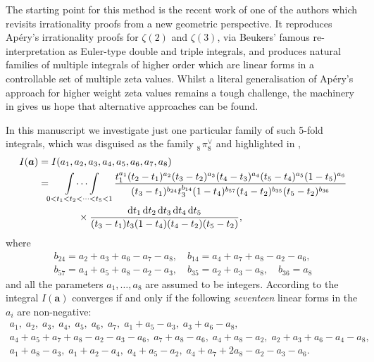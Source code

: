 \documentclass[12pt,reqno]{amsart}
\theoremstyle{remark}
\renewcommand{\d}{{\mathrm d}}
\newcommand\ba{\boldsymbol a}
\begin{document}
The starting point for this method is the recent work \cite{Br16} of one of the authors  which revisits irrationality proofs from a new   geometric perspective. It reproduces  Ap\'ery's irrationality proofs for $\zeta(2)$ and $\zeta(3)$, via Beukers'  famous  re-interpretation \cite{Be79} as Euler-type double and triple integrals,   and produces natural families of multiple integrals of higher order which are linear forms in a  controllable set of multiple zeta values. Whilst a literal generalisation of  Ap\'ery's approach for higher weight zeta values remains a tough challenge, the machinery in \cite{Br16} gives us hope that alternative approaches can be found.

In this manuscript we investigate just one  particular family of such 5-fold integrals, which was  disguised as the family ${}^{\phantom\vee}_8\!\pi^\vee_8$ and highlighted in \cite[Example 7.5]{Br16},
\begin{align}
I(\ba)
&=I(a_1,a_2,a_3,a_4,a_5,a_6,a_7,a_8)
\nonumber\\
&=\idotsint\limits_{0<t_1<t_2<\dots<t_5<1}
\frac{t_1^{a_1}(t_2 - t_1)^{a_2}(t_3 - t_2)^{a_3}(t_4 - t_3)^{a_4}(t_5 - t_4)^{a_5}(1 - t_5)^{a_6}}
{(t_3 - t_1)^{b_{24}}t_3^{b_{14}}(1 - t_4)^{b_{57}}
(t_4 - t_2)^{b_{35}}(t_5 - t_2)^{b_{36}}}
\nonumber\\ &\qquad\qquad\times
\frac{\d t_1\,\d t_2\,\d t_3\,\d t_4\,\d t_5}{(t_3 - t_1)t_3(1 - t_4)(t_4 - t_2)(t_5 - t_2)},
\label{I1}
\end{align}
where
\begin{equation}
\begin{gathered}
b_{24} = a_2 + a_3 + a_6 - a_7 - a_8, \quad b_{14} =  a_4 +  a_7 + a_8  - a_2  - a_6 , \\
b_{57} =  a_4 + a_5 + a_8 - a_2 - a_3, \quad b_{35} = a_2 + a_3 - a_8, \quad b_{36} = a_8
\end{gathered}
\label{b-param}
\end{equation}
and all the parameters $a_1,\dots,a_8$ are assumed to be integers.
According to \cite[Sects.~5.1 and~5.2]{Br16} the integral $I(\ba)$ converges if and only if the following \emph{seventeen} linear forms in the $a_i$ are non-negative:
\begin{equation}
\begin{gathered}
a_1, \; a_2, \; a_3, \; a_4, \; a_5, \; a_6, \; a_7, \; a_1 + a_5 - a_3, \; a_3 + a_6 - a_8, \\
a_4 + a_5 +a_7 + a_8 - a_2 - a_3 - a_6, \; a_7 + a_8 - a_6, \; a_4 + a_8 - a_2, \; a_2 + a_3 + a_6 - a_4 - a_8, \\
a_1 + a_8 - a_3, \; a_1 + a_2 - a_4, \; a_4 + a_5 - a_2, \; a_4 + a_7 +2 a_8      - a_2 - a_3 - a_6.
\end{gathered}
\label{17elem}
\end{equation}
\end{document}
